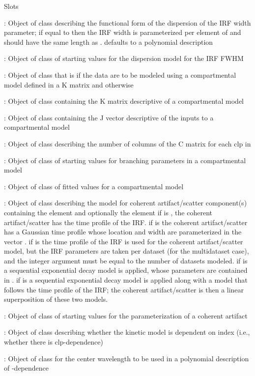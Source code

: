 \documentclass{article}
\begin{document}
\begin{Section}{Slots}
\item[\code{disptaufun}:] Object of class   describing the functional form of the 
dispersion of the IRF width parameter; if equal to  then the 
IRF width is parameterized per element of  and  should have the same 
length as .  defaults to a polynomial description
\item[\code{partau}:] Object of class   of starting values for the dispersion model for the 
IRF FWHM 
\item[\code{fullk}:] Object of class   that is  if the data are to be modeled using a 
compartmental model defined in a K matrix and  otherwise
\item[\code{kmat}:] Object of class   containing the K matrix descriptive of  a compartmental 
model
\item[\code{jvec}:] Object of class   containing the J vector descriptive of the inputs to a 
compartmental model
\item[\code{ncolc}:] Object of class   describing the number of columns of the C matrix for 
each clp in 
\item[\code{kinscal}:] Object of class    of starting values for branching parameters in a 
compartmental model
\item[\code{kmatfit}:] Object of class   of fitted values for a compartmental model
\item[\code{cohspec}:] Object of class    describing the model for 
coherent artifact/scatter component(s) containing the element  
and optionally the element 
if  is , the coherent artifact/scatter has the 
time profile of 
the IRF.  if  is  the  coherent 
artifact/scatter has  a
Gaussian time profile whose location and width are parameterized in the 
vector .  if  is  the time profile of 
the IRF is used for
the coherent artifact/scatter model, but the IRF parameters are taken per 
dataset (for the multidataset case), and the integer argument 
 must be equal to the 
number of datasets modeled.  if  is  
a sequential exponential decay 
model is applied, whose parameters are contained in .
if  is  a sequential exponential decay 
model is applied along with a model that follows the time profile of the IRF;
the coherent artifact/scatter is then a linear superposition of these two 
models.  
\item[\code{coh}:] Object of class   of starting values for the parameterization of a  
coherent artifact
\item[\code{wavedep}:] Object of class   describing whether the kinetic model is dependent on
 index (i.e., whether there is clp-dependence)
\item[\code{lambdac}:] Object of class   for the center wavelength to be used in a polynomial 
description of -dependence 
\end{Section}
\end{document}

